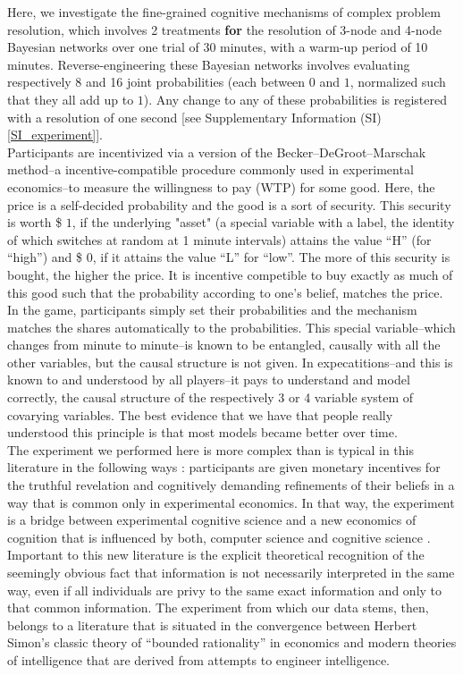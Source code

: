 Here, we investigate the fine-grained cognitive mechanisms of complex problem resolution, which involves 2 treatments {\bf for} the resolution of 3-node and 4-node Bayesian networks over one trial of 30 minutes, with a warm-up period of 10 minutes. Reverse-engineering these Bayesian networks involves evaluating respectively 8 and 16 joint probabilities (each between $0$ and $1$, normalized such that they all add up to $1$). Any change to any of these probabilities is registered with a resolution of one second [see Supplementary Information (SI) \ref{SI_experiment}].\\

Participants are incentivized via a version of the Becker–DeGroot–Marschak method--a incentive-compatible procedure commonly used in experimental economics--to measure the willingness to pay (WTP) for some good. Here, the price is a self-decided probability and the good is a sort of security.  This security is worth \$ $1$, if the underlying "asset" (a special variable with a label, the identity of which switches at random at 1 minute intervals) attains the value ``H'' (for ``high'') and \$ $0$, if it attains the value ``L'' for ``low''. The more of this security is bought, the higher the price. It is incentive competible to buy exactly as much of this good such that the probability according to one's belief, matches the price. In the game, participants simply set their probabilities and the mechanism matches the shares automatically to the probabilities.  This special variable--which changes from minute to minute--is known to be entangled, causally with all the other variables, but the causal structure is not given.  In expecatitions--and this is known to and understood by all players--it pays to understand and model correctly, the causal structure of the respectively 3 or 4 variable system of covarying variables.  The best evidence that we have that people really understood this principle is that most models became better over time.  \\

The experiment we performed here is more complex than is typical in this literature in the following ways : participants are given monetary incentives for the truthful revelation and cognitively demanding refinements of their beliefs in a way that is common only in experimental economics.  In that way, the experiment is a bridge between experimental cognitive science and a new economics of cognition that is influenced by both, computer science and cognitive science \cite{Spiegler2016}. Important to this new literature is the explicit theoretical recognition of the seemingly obvious fact that information is not necessarily interpreted in the same way, even if all individuals are privy to the same exact information and only to that common information. The experiment from which our data stems, then, belongs to a literature that is situated in the convergence between Herbert Simon's classic theory of ``bounded rationality'' in economics \cite{Gigerenzer2001, Rubinstein98, tsang2008computational, simon1955behavioral} and modern theories of intelligence that are derived from attempts to engineer intelligence.\\  

